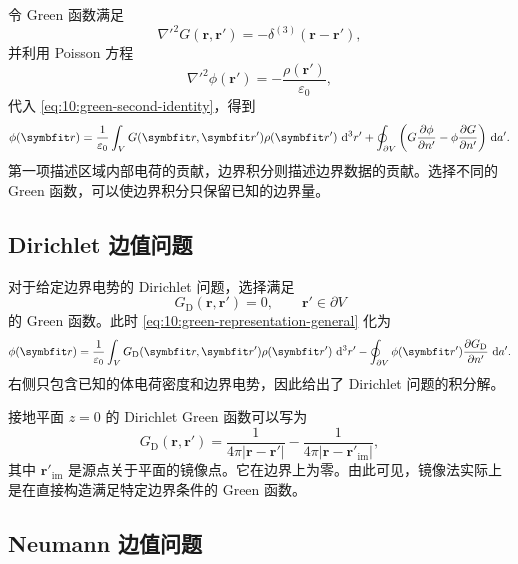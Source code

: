 令 Green 函数满足
\[
\nabla'^{2}G(\bm{r},\bm{r}')
=
-\delta^{(3)}(\bm{r}-\bm{r}'),
\]
并利用 Poisson 方程
\[
\nabla'^{2}\phi(\bm{r}')
=
-\frac{\rho(\bm{r}')}{\varepsilon_{0}},
\]
代入 \eqref{eq:10:green-second-identity}，得到
\begin{equation}
	\phi(\bm{r})
	=
	\frac{1}{\varepsilon_{0}}
	\int_{V}
	G(\bm{r},\bm{r}')
	\rho(\bm{r}')
	\,\dif^{3}r'
	+
	\oint_{\partial V}
	\left(
	G\frac{\partial\phi}{\partial n'}
	-
	\phi\frac{\partial G}{\partial n'}
	\right)
	\,\dif a'.
	\label{eq:10:green-representation-general}
\end{equation}
第一项描述区域内部电荷的贡献，边界积分则描述边界数据的贡献。选择不同的 Green 函数，可以使边界积分只保留已知的边界量。

\subsection{Dirichlet 边值问题}

对于给定边界电势的 Dirichlet 问题，选择满足
\begin{equation}
	G_{\mathrm{D}}(\bm{r},\bm{r}')=0,
	\qquad
	\bm{r}'\in\partial V
	\label{eq:10:dirichlet-green-boundary}
\end{equation}
的 Green 函数。此时 \eqref{eq:10:green-representation-general} 化为
\begin{equation}
	\phi(\bm{r})
	=
	\frac{1}{\varepsilon_{0}}
	\int_{V}
	G_{\mathrm{D}}(\bm{r},\bm{r}')
	\rho(\bm{r}')
	\,\dif^{3}r'
	-
	\oint_{\partial V}
	\phi(\bm{r}')
	\frac{\partial G_{\mathrm{D}}}{\partial n'}
	\,\dif a'.
	\label{eq:10:dirichlet-green-solution}
\end{equation}
右侧只包含已知的体电荷密度和边界电势，因此给出了 Dirichlet 问题的积分解。

接地平面 $z=0$ 的 Dirichlet Green 函数可以写为
\[
G_{\mathrm{D}}(\bm{r},\bm{r}')
=
\frac{1}{4\pi|\bm{r}-\bm{r}'|}
-
\frac{1}{4\pi|\bm{r}-\bm{r}'_{\mathrm{im}}|},
\]
其中 $\bm{r}'_{\mathrm{im}}$ 是源点关于平面的镜像点。它在边界上为零。由此可见，镜像法实际上是在直接构造满足特定边界条件的 Green 函数。

\subsection{Neumann 边值问题}

